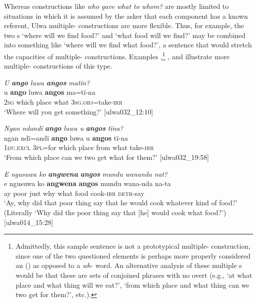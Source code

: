 Whereas  constructions like \textit{who gave what to whom?} are mostly limited to situations in which it is assumed by the asker that each  component has a known referent, Ulwa multiple- constructions are more flexible. Thus, for example, the two s ‘where will we find food?’ and ‘what food will we find?’ may be combined into something like ‘where will we find what food?’, a sentence that would stretch the capacities of  multiple- constructions. Examples ,\footnote{Admittedly, this sample sentence is not a prototypical multiple- construction, since one of the two questioned elements is perhaps more properly considered an  () as opposed to a \textit{wh-} word. An alternative analysis of these multiple s would be that these are sets of conjoined phrases with no overt  (e.g., ‘at what place and what thing will we eat?’, ‘from which place and what thing can we two get for them?’, etc.).} , and  illustrate more multiple- constructions of this type.

\ea%
    \label{ex:syntax:61}
          \textit{U \textbf{ango} luwa \textbf{angos} matïn?}\\
\gll    u    \textbf{ango}  luwa  \textbf{angos}  ma=tï-na\\
2\textsc{sg}  which  place  what  3\textsc{sg.obj}=take-\textsc{irr}\\
\glt `Where will you get something?’ [ulwa032\_12:10]
\z

\ea%
    \label{ex:syntax:62}
          \textit{Ngan ndandï} \textbf{\textit{ango}} \textit{luwa u} \textbf{\textit{angos}} \textit{tïna?}\\
\gll    ngan    ndï=andï  \textbf{ango}  luwa  u    \textbf{angos}  tï-na\\
    1\textsc{du.excl}  3\textsc{pl}=for  which  place  from  what  take-\textsc{irr}\\
\glt `From which place can we two get what for them?’ [ulwa032\_19:58]
\z

\newpage

\ea%
    \label{ex:syntax:63}
          \textit{E ngusuwa ko} \textbf{\textit{angwena}} \textbf{\textit{angos}} \textit{mundu wananda nat?}\\
\gll    e  ngusuwa  ko  \textbf{angwena}  \textbf{angos}  mundu  wana-nda  na-ta\\
    ay  poor    just  why    what  food  cook-\textsc{irr}  \textsc{detr}{}-say\\
\glt `Ay, why did that poor thing say that he would cook whatever kind of food?’ (Literally ‘Why did the poor thing say that [he] would cook what food?’) [ulwa014\_15:28]
\z

